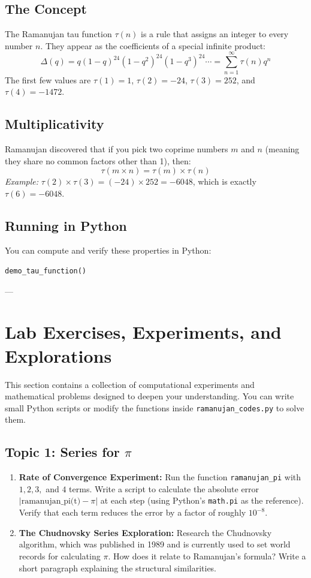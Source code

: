 \documentclass[11pt]{article}
\begin{document}
\subsection{The Concept}
The Ramanujan tau function $\tau(n)$ is a rule that assigns an integer to every number $n$. They appear as the coefficients of a special infinite product:
\[
\Delta(q) = q(1-q)^{24}(1-q^2)^{24}(1-q^3)^{24}\cdots = \sum_{n=1}^{\infty} \tau(n) q^n
\]
The first few values are $\tau(1) = 1$, $\tau(2) = -24$, $\tau(3) = 252$, and $\tau(4) = -1472$.

\subsection{Multiplicativity}
Ramanujan discovered that if you pick two coprime numbers $m$ and $n$ (meaning they share no common factors other than 1), then:
\[
\tau(m \times n) = \tau(m) \times \tau(n)
\]
\emph{Example:} $\tau(2) \times \tau(3) = (-24) \times 252 = -6048$, which is exactly $\tau(6) = -6048$.

\subsection{Running in Python}
You can compute and verify these properties in Python:
\begin{lstlisting}
demo_tau_function()
\end{lstlisting}

---

\section{Lab Exercises, Experiments, and Explorations}

This section contains a collection of computational experiments and mathematical problems designed to deepen your understanding. You can write small Python scripts or modify the functions inside \texttt{ramanujan\_codes.py} to solve them.

\subsection{Topic 1: Series for $\pi$}
\begin{enumerate}
    \item \textbf{Rate of Convergence Experiment:} Run the function \texttt{ramanujan\_pi} with $1, 2, 3,$ and $4$ terms. Write a script to calculate the absolute error $| \text{ramanujan\_pi(t)} - \pi |$ at each step (using Python's \texttt{math.pi} as the reference). Verify that each term reduces the error by a factor of roughly $10^{-8}$.
    \item \textbf{The Chudnovsky Series Exploration:} Research the Chudnovsky algorithm, which was published in 1989 and is currently used to set world records for calculating $\pi$. How does it relate to Ramanujan's formula? Write a short paragraph explaining the structural similarities.
\end{enumerate}
\end{document}
